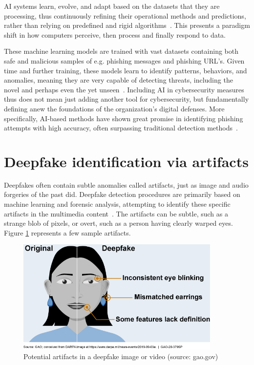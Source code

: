 AI systems learn, evolve, and adapt based on the datasets that they are processing, thus continuously refining their operational methods and predictions, rather than relying on predefined and rigid algorithms~\citep{fakhouri_AI_Driven_Solutions_SE_Attacks_2024}. This presents a paradigm shift in how computers perceive, then process and finally respond to data.

These machine learning models are trained with vast datasets containing both safe and malicious samples of e.g. phishing messages and phishing URL's. Given time and further training, these models learn to identify patterns, behaviors, and anomalies, meaning they are very capable of detecting threats, including the novel and perhaps even the yet unseen~\citep{fakhouri_AI_Driven_Solutions_SE_Attacks_2024}. Including AI in cybersecurity measures thus does not mean just adding another tool for cybersecurity, but fundamentally defining anew the foundations of the organization’s digital defenses. More specifically, AI-based methods have shown great promise in identifying phishing attempts with high accuracy, often surpassing traditional detection methods~\citep{basit_Comprehensive_Survey_AI_Phishing_Detection_2021}.




\section{Deepfake identification via artifacts}

Deepfakes often contain subtle anomalies called artifacts, just as image and audio forgeries of the past did. Deepfake detection procedures are primarily based on machine learning and forensic analysis, attempting to identify these specific artifacts in the multimedia content~\citep{mirsky_Creation_Detection_Deepfakes_2021}. The artifacts can be subtle, such as a strange blob of pixels, or overt, such as a person having clearly warped eyes. Figure \ref{figure:artifacts} represents a few sample artifacts.

\begin{figure}[h]  
    \centering  
    \includegraphics[width=0.9\textwidth]{images/rId14_image5.png}  
    \caption{Potential artifacts in a deepfake image or video (source: gao.gov)}  
    \label{figure:artifacts}  
\end{figure}  

